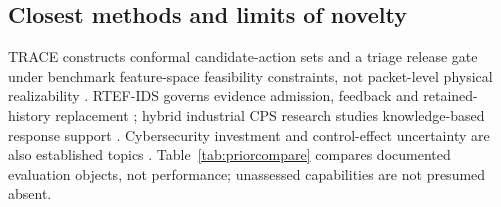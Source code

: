\documentclass[preprint,12pt]{elsarticle}
\begin{document}
\subsection{Closest methods and limits of novelty}
TRACE constructs conformal candidate-action sets and a triage release gate under benchmark feature-space feasibility constraints, not packet-level physical realizability \cite{le2026trace}. RTEF-IDS governs evidence admission, feedback and retained-history replacement \cite{li2026rtef}; hybrid industrial CPS research studies knowledge-based response support \cite{guarino2026hybrid}. Cybersecurity investment and control-effect uncertainty are also established topics \cite{zhang2025uncertainty}. Table~\ref{tab:priorcompare} compares documented evaluation objects, not performance; unassessed capabilities are not presumed absent.
\end{document}
